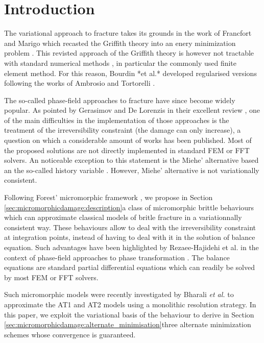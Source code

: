 \section{Introduction}

The variational approach to fracture takes its grounds in the work of
Francfort and Marigo which recasted the Griffith theory into an enery
minimization problem \cite{francfort_revisiting_1998,francfort_vers_2002}.
This revisted approach of the Griffith theory is however not tractable
with standard numerical methods
\cite{bourdin_numerical_2000,chambolle_approximation_2018}, in particular
the commonly used finite element method. For this reason, Bourdin *et
al.* developed regularised versions \cite{bourdin_numerical_2000} following
the works of Ambrosio and Tortorelli \cite{ambrosio_approximation_1990}.

The so-called phase-field approaches to fracture have since become
widely popular. As pointed by Gerasimov and De Lorenzis in their
excellent review \cite{gerasimov_numerical_2020}, one of the main
difficulties in the implementation of those approaches is the treatment
of the irreversibility constraint (the damage can only increase), a
question on which a considerable amount of works has been published.
Most of the proposed solutions are not directly implemented in standard
FEM or FFT solvers. An noticeable exception to this statement is the
Miehe' alternative based an the so-called history variable
\cite{miehe_phase_2010}. However, Miehe' alternative is not variationally
consistent.

Following Forest' micromorphic framework
\cite{forest_micromorphic_2009,forest_nonlinear_2016}, we propose in
Section \ref{sec:micromorphicdamage:description}a class of micromorphic
brittle behaviours which can approximate classical models of britle
fracture in a variationnally consistent way. These behaviours allow to
deal with the irreversibility constraint at integration points,
instead of having to deal with it in the solution of balance equation. Such
advantages have been highlighted by Rezaee-Hajidehi et al. in the
context of phase-field approaches to phase transformation
\cite{rezaee-hajidehi_micromorphic_2021}. The balance equations are
standard partial differential equations which can readily be solved by
most FEM or FFT solvers.

Such micromorphic models were recently investigated by Bharali \textit{et al.}
\cite{bharali_computational_2021} to approximate the AT1 and AT2 models
using a monolithic resolution strategy. In this paper, we exploit the
variational basis of the behaviour to derive in Section
\ref{sec:micromorphicdamage:alternate_minimisation}three alternate
minimization schemes whose convergence is guaranteed.

